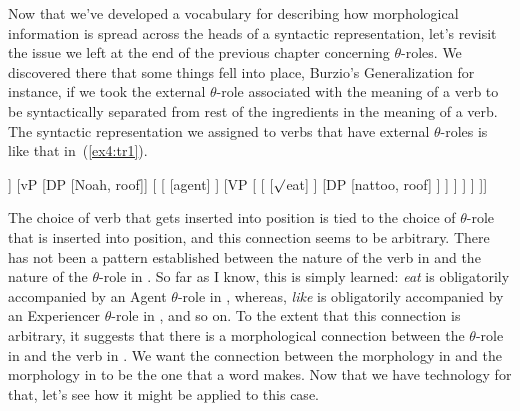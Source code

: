 Now that we've developed a vocabulary for describing how morphological information is spread across the heads of a syntactic representation, let's revisit the issue we left at the end of the previous chapter concerning $\theta$-roles. We discovered there that some things fell into place, Burzio's Generalization for instance, if we took the external $\theta$-role associated with the meaning of a verb to be syntactically separated from rest of the ingredients in the meaning of a verb. The syntactic representation we assigned to verbs that have external $\theta$-roles is like that in~(\ref{ex4:tr1}).
\begin{exe}
	\raggedright
	\ex \label{ex4:tr1} 
	\small
	\begin{forest}
	[TP [\ibar{T}
		[\obar{T} [will]]
		[vP
			[DP [Noah, roof]]
			[
				[ [agent] ]
				[VP [
					[ [$\surd$eat] ]
					[DP [nattoo, roof] ]
				] ]
			 ]
		 ]
	]]
	\end{forest}
\end{exe}
The choice of verb that gets inserted into  position is tied to the choice of \mbox{$\theta$-role} that is inserted into  position, and this connection seems to be arbitrary. There has not been a pattern established between the nature of the verb in  and the nature of the $\theta$-role in . So far as I know, this is simply learned: \emph{eat} is obligatorily accompanied by an Agent $\theta$-role in , whereas, \emph{like} is obligatorily accompanied by an Experiencer $\theta$-role in , and so on. To the extent that this connection is arbitrary, it suggests that there is a morphological connection between the $\theta$-role in  and the verb in . We want the connection between the morphology in  and the morphology in  to be the one that a word makes. Now that we have technology for that, let's see how it might be applied to this case.

